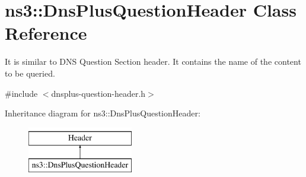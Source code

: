 \hypertarget{classns3_1_1DnsPlusQuestionHeader}{\section{ns3\-:\-:Dns\-Plus\-Question\-Header Class Reference}
\label{classns3_1_1DnsPlusQuestionHeader}
}


It is similar to D\-N\-S Question Section header. It contains the name of the content to be queried.  




{\ttfamily \#include $<$dnsplus-\/question-\/header.\-h$>$}

Inheritance diagram for ns3\-:\-:Dns\-Plus\-Question\-Header\-:\begin{figure}[H]
\begin{center}
\leavevmode
\includegraphics[height=2.000000cm]{classns3_1_1DnsPlusQuestionHeader}
\end{center}
\end{figure}
